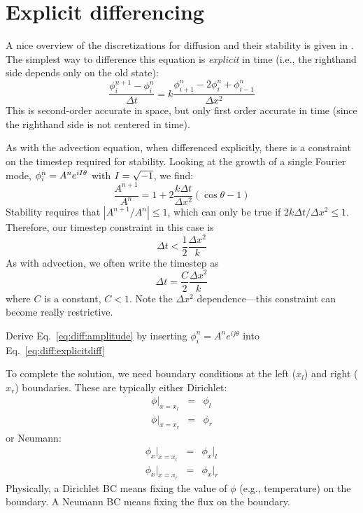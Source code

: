 \section{Explicit differencing}

A nice overview of the discretizations for diffusion and their stability
is given in \cite{richtmyermorton}.  
The simplest way to difference this equation is {\em explicit} in time
(i.e., the righthand side depends only on the old state):
\begin{equation}
\label{eq:diff:explicitdiff}
\frac{\phi_i^{n+1} - \phi_i^n}{\Delta t} = 
  k \frac{\phi_{i+1}^n - 2\phi_i^n + \phi_{i-1}^n}{\Delta x^2}
\end{equation}
This is second-order accurate in space, but only first order accurate in
time (since the righthand side is not centered in time).

As with the advection equation, when differenced explicitly, there is
a constraint on the timestep required for stability.  Looking at the
growth of a single Fourier mode, $\phi^n_i = A^n e^{iI\theta}$ with $I =
\sqrt{-1}$, we find:
\begin{equation}
\label{eq:diff:amplitude}
\frac{A^{n+1}}{A^n} = 1 + 2 \frac{k \Delta t}{\Delta x^2} ( \cos\theta - 1)
\end{equation}
Stability requires that $|A^{n+1}/A^n| \le 1$, which can only be true
if $2k\Delta t/\Delta x^2 \le 1$.  Therefore, our timestep
constraint in this case is
\begin{equation}
\label{eq:diff:dt}
\Delta t < \frac{1}{2} \frac{\Delta x^2}{k}
\end{equation}
As with advection, we often write the timestep as
\begin{equation}
\Delta t = \frac{C}{2} \frac{\Delta x^2}{k}
\end{equation}
where $C$ is a constant, $C < 1$. 
Note the $\Delta x^2$ dependence---this constraint can become really
restrictive.

\begin{exercise}
Derive Eq.~\ref{eq:diff:amplitude} by inserting $\phi^n_i = A^n e^{ij\theta}$
into Eq.~\ref{eq:diff:explicitdiff}
\end{exercise}

To complete the solution, we need boundary conditions at the left
($x_l$) and right ($x_r$) boundaries.  These are typically either
Dirichlet:
\begin{eqnarray}
\phi |_{x=x_l} &=& \phi_l\\
\phi |_{x=x_r} &=& \phi_r
\end{eqnarray}
or Neumann:
\begin{eqnarray}
\phi_x |_{x=x_l} &=& \phi_x |_l\\
\phi_x |_{x=x_r} &=& \phi_x |_r
\end{eqnarray}
Physically, a Dirichlet BC means fixing the value of $\phi$ (e.g., temperature)
on the boundary.  A Neumann BC means fixing the flux on the boundary.

